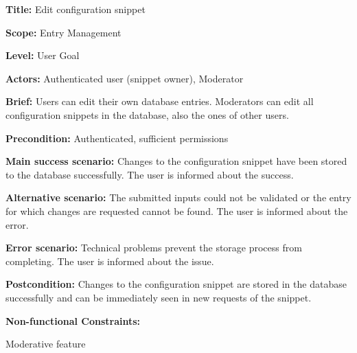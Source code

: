 
\begin{DoxyItemize}
\item {\bfseries Title\+:} Edit configuration snippet
\item {\bfseries Scope\+:} Entry Management
\item {\bfseries Level\+:} User Goal
\item {\bfseries Actors\+:} Authenticated user (snippet owner), Moderator
\item {\bfseries Brief\+:} Users can edit their own database entries. Moderators can edit all configuration snippets in the database, also the ones of other users.
\end{DoxyItemize}


\begin{DoxyItemize}
\item {\bfseries Precondition\+:} Authenticated, sufficient permissions
\item {\bfseries Main success scenario\+:} Changes to the configuration snippet have been stored to the database successfully. The user is informed about the success.
\item {\bfseries Alternative scenario\+:} The submitted inputs could not be validated or the entry for which changes are requested cannot be found. The user is informed about the error.
\item {\bfseries Error scenario\+:} Technical problems prevent the storage process from completing. The user is informed about the issue.
\item {\bfseries Postcondition\+:} Changes to the configuration snippet are stored in the database successfully and can be immediately seen in new requests of the snippet.
\item {\bfseries Non-\/functional Constraints\+:}
\begin{DoxyItemize}
\item Moderative feature 
\end{DoxyItemize}
\end{DoxyItemize}